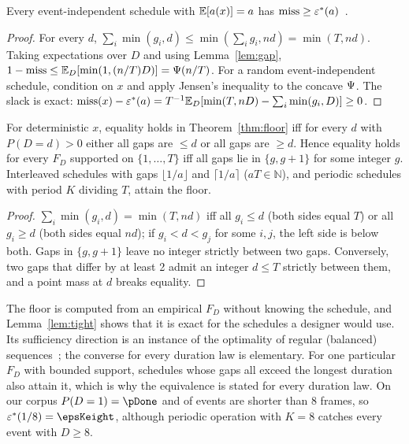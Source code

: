 \begin{theorem}\label{thm:floor}
Every event-independent schedule with $\mathbb{E}[a(x)]=a$ has $\mathrm{miss}\ge\varepsilon^*(a)$~\cite[Thms.~4--5]{deep3_jiot2026}.
\end{theorem}
\begin{proof}
For every $d$, $\sum_i\min(g_i,d)\le\min(\sum_ig_i,nd)=\min(T,nd)$. Taking expectations over $D$ and using Lemma~\ref{lem:gap}, $1-\mathrm{miss}\le\mathbb{E}_D[\min(1,(n/T)D)]=\Psi(n/T)$. For a random event-independent schedule, condition on $x$ and apply Jensen's inequality to the concave $\Psi$. The slack is exact: $\mathrm{miss}(x)-\varepsilon^*(a)=T^{-1}\mathbb{E}_D[\min(T,nD)-\sum_i\min(g_i,D)]\ge0$.
\end{proof}
\begin{lemma}\label{lem:tight}
For deterministic $x$, equality holds in Theorem~\ref{thm:floor} iff for every $d$ with $P(D=d)>0$ either all gaps are $\le d$ or all gaps are $\ge d$. Hence equality holds for every $F_D$ supported on $\{1,\dots,T\}$ iff all gaps lie in $\{g,g+1\}$ for some integer $g$. Interleaved schedules with gaps $\lfloor1/a\rfloor$ and $\lceil1/a\rceil$ ($aT\in\mathbb{N}$), and periodic schedules with period $K$ dividing $T$, attain the floor.
\end{lemma}
\begin{proof}
$\sum_i\min(g_i,d)=\min(T,nd)$ iff all $g_i\le d$ (both sides equal $T$) or all $g_i\ge d$ (both sides equal $nd$); if $g_i<d<g_j$ for some $i,j$, the left side is below both. Gaps in $\{g,g+1\}$ leave no integer strictly between two gaps. Conversely, two gaps that differ by at least 2 admit an integer $d\le T$ strictly between them, and a point mass at $d$ breaks equality.
\end{proof}
\noindent The floor is computed from an empirical $F_D$ without knowing the schedule, and Lemma~\ref{lem:tight} shows that it is exact for the schedules a designer would use. Its sufficiency direction is an instance of the optimality of regular (balanced) sequences~\cite{hajek1985moor,altman2000moor}; the converse for every duration law is elementary. For one particular $F_D$ with bounded support, schedules whose gaps all exceed the longest duration also attain it, which is why the equivalence is stated for every duration law. On our corpus $P(D=1)=\pDone$ and \pDltEight{} of events are shorter than 8 frames, so $\eps^*(1/8)=\epsKeight$, although periodic operation with $K=8$ catches every event with $D\ge8$.

